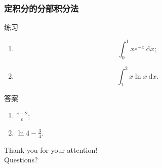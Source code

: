 \documentclass[
10pt,
aspectratio=43,
]{beamer}
\begin{document}
\begin{frame}
	\frametitle{定积分的分部积分法}
	\everymath{\displaystyle}
	\begin{block}{练习}
		\begin{enumerate}
			\item
			      $$
				      \int_0^1 x e^{-x}  \mathrm{~d} x;
			      $$
			\item
			      $$
				      \int_1^2 x \ln x \mathrm{~d} x.
			      $$
		\end{enumerate}
	\end{block}
	\pause 
	\begin{exampleblock}{答案}
		\begin{enumerate}[<+->]
			\item $\frac{e-2}{e}$;\vspace{0.5cm}
			\item $\ln 4-\frac{3}{4}$.
		\end{enumerate}
	\end{exampleblock}
\end{frame}

\begin{frame}[plain]
	\vfill
	\centering
	{
		\centering \Huge \color{white} Thank you for your attention!\\[10pt]Questions?
	}
	\vfill
\end{frame}
\end{document}
